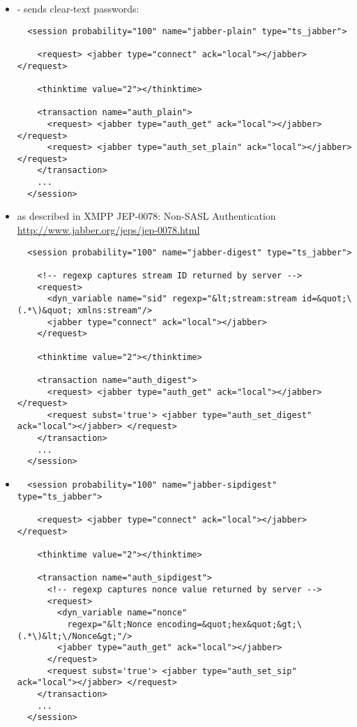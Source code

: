 \documentclass{TSUNG-en}
\begin{document}
\begin{itemize}
\item {} - sends clear-text passwords:
\begin{Verbatim}
  <session probability="100" name="jabber-plain" type="ts_jabber">

    <request> <jabber type="connect" ack="local"></jabber> </request>

    <thinktime value="2"></thinktime>

    <transaction name="auth_plain">
      <request> <jabber type="auth_get" ack="local"></jabber> </request>
      <request> <jabber type="auth_set_plain" ack="local"></jabber> </request>
    </transaction>
    ...
  </session>
\end{Verbatim}
\item {}  as described in XMPP JEP-0078: Non-SASL Authentication
   \url{http://www.jabber.org/jeps/jep-0078.html}
\begin{Verbatim}
  <session probability="100" name="jabber-digest" type="ts_jabber">

    <!-- regexp captures stream ID returned by server -->
    <request>
      <dyn_variable name="sid" regexp="&lt;stream:stream id=&quot;\(.*\)&quot; xmlns:stream"/>
      <jabber type="connect" ack="local"></jabber>
    </request>

    <thinktime value="2"></thinktime>

    <transaction name="auth_digest">
      <request> <jabber type="auth_get" ack="local"></jabber> </request>
      <request subst='true'> <jabber type="auth_set_digest" ack="local"></jabber> </request>
    </transaction>
    ...
  </session>
\end{Verbatim}
\item {}
\begin{Verbatim}
  <session probability="100" name="jabber-sipdigest" type="ts_jabber">

    <request> <jabber type="connect" ack="local"></jabber> </request>

    <thinktime value="2"></thinktime>

    <transaction name="auth_sipdigest">
      <!-- regexp captures nonce value returned by server -->
      <request>
        <dyn_variable name="nonce"
          regexp="&lt;Nonce encoding=&quot;hex&quot;&gt;\(.*\)&lt;\/Nonce&gt;"/>
        <jabber type="auth_get" ack="local"></jabber>
      </request>
      <request subst='true'> <jabber type="auth_set_sip" ack="local"></jabber> </request>
    </transaction>
    ...
  </session>
\end{Verbatim}
\end{itemize}
\end{document}
